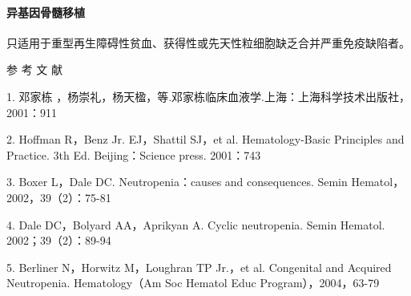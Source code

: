 \paragraph{异基因骨髓移植}

只适用于重型再生障碍性贫血、获得性或先天性粒细胞缺乏合并严重免疫缺陷者。

\protect\hypertarget{text00337.html}{}{}

\hypertarget{text00337.htmlux5cux23CHP12-2-4}{}
参 考 文 献

1. 邓家栋
，杨崇礼，杨天楹，等.邓家栋临床血液学.上海：上海科学技术出版社，2001：911

2. Hoffman R，Benz Jr. EJ，Shattil SJ，et al. Hematology-Basic
Principles and Practice. 3th Ed. Beijing：Science press. 2001：743

3. Boxer L，Dale DC. Neutropenia：causes and consequences. Semin
Hematol，2002，39（2）：75-81

4. Dale DC，Bolyard AA，Aprikyan A. Cyclic neutropenia. Semin Hematol.
2002；39（2）：89-94

5. Berliner N，Horwitz M，Loughran TP Jr.，et al. Congenital and
Acquired Neutropenia. Hematology（Am Soc Hematol Educ
Program），2004，63-79

\protect\hypertarget{text00338.html}{}{}


